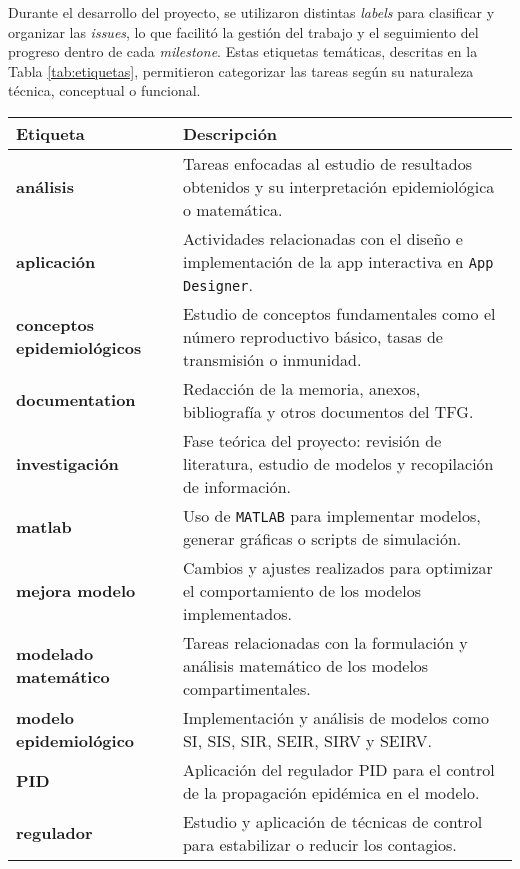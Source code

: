 Durante el desarrollo del proyecto, se utilizaron distintas \textit{labels} para clasificar y organizar las \textit{issues}, lo que facilitó la gestión del trabajo y el seguimiento del progreso dentro de cada \textit{milestone}. Estas etiquetas temáticas, descritas en la Tabla \ref{tab:etiquetas}, permitieron categorizar las tareas según su naturaleza técnica, conceptual o funcional.


\begin{table}[H]
    \centering
    
    \begin{tabular}{|p{4cm}|p{10cm}|}
    \hline
    \textbf{Etiqueta} & \textbf{Descripción} \\
    \hline
    \textbf{análisis} & Tareas enfocadas al estudio de resultados obtenidos y su interpretación epidemiológica o matemática. \\
    \hline
    \textbf{aplicación} & Actividades relacionadas con el diseño e implementación de la app interactiva en \texttt{App Designer}. \\
    \hline
    \textbf{conceptos epidemiológicos} & Estudio de conceptos fundamentales como el número reproductivo básico, tasas de transmisión o inmunidad. \\
    \hline
    \textbf{documentation} & Redacción de la memoria, anexos, bibliografía y otros documentos del TFG. \\
    \hline
    \textbf{investigación} & Fase teórica del proyecto: revisión de literatura, estudio de modelos y recopilación de información. \\
    \hline
    \textbf{matlab} & Uso de \texttt{MATLAB} para implementar modelos, generar gráficas o scripts de simulación. \\
    \hline
    \textbf{mejora modelo} & Cambios y ajustes realizados para optimizar el comportamiento de los modelos implementados. \\
    \hline
    \textbf{modelado matemático} & Tareas relacionadas con la formulación y análisis matemático de los modelos compartimentales. \\
    \hline
    \textbf{modelo epidemiológico} & Implementación y análisis de modelos como SI, SIS, SIR, SEIR, SIRV y SEIRV. \\
    \hline
    \textbf{PID} & Aplicación del regulador PID para el control de la propagación epidémica en el modelo. \\
    \hline
    \textbf{regulador} & Estudio y aplicación de técnicas de control para estabilizar o reducir los contagios. \\

\end{tabular}
\end{table}
